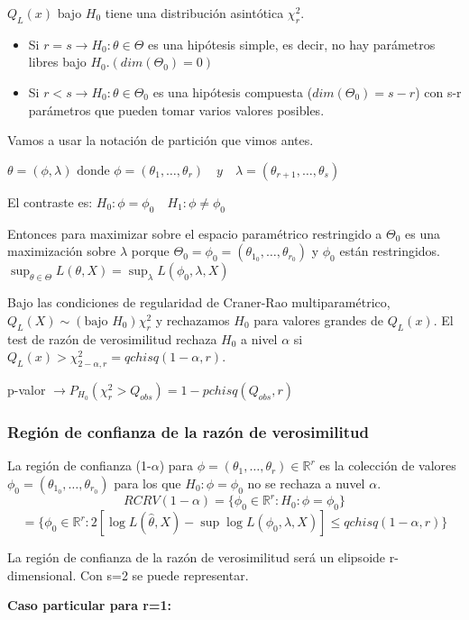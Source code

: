 $Q_L(x)$ bajo $H_0$ tiene una distribución asintótica $\chi^2_r$.
\begin{itemize}
    \item Si $r=s \to H_0:\theta \in \Theta$ es una hipótesis simple, es decir, no hay parámetros libres bajo $H_0.(dim(\Theta_0)=0)$
    \item Si $r<s \to H_0:\theta \in \Theta_0$ es una hipótesis compuesta ($dim(\Theta_0)=s-r$) con s-r parámetros que pueden tomar varios valores posibles.
\end{itemize}

Vamos a usar la notación de partición que vimos antes.

\(
\theta=(\phi,\lambda) \text{ donde } \phi=(\theta_1,\dots,\theta_r) \quad y \quad \lambda=(\theta_{r+1},\dots,\theta_s)
\)

El contraste es: $H_0:\phi=\phi_0 \quad H_1:\phi \neq \phi_0$

Entonces para maximizar sobre el espacio paramétrico restringido a $\Theta_0$ es una maximización sobre $\lambda$ porque
$\Theta_0=\phi_0=(\theta_{1_0},\dots,\theta_{r_0})$ y $\phi_0$ están restringidos.
$\sup_{\theta \in \Theta}L(\theta,X)=\sup_\lambda L(\phi_0,\lambda,X)$

Bajo las condiciones de regularidad de Craner-Rao multiparamétrico, $Q_L(X) \sim (\text{bajo }H_0) \chi^2_r$
y rechazamos $H_0$ para valores grandes de $Q_L(x)$. El test de razón de verosimilitud rechaza $H_0$ a nivel $\alpha$ si $Q_L(x)>\chi^2_{2-\alpha,r}=qchisq(1-\alpha,r)$.

p-valor $\to P_{H_0}(\chi^2_r>Q_{obs})=1-pchisq(Q_{obs},r)$

\subsubsection{Región de confianza de la razón de verosimilitud}

La región de confianza (1-$\alpha$) para $\phi=(\theta_1,\dots,\theta_r)\in \mathbb{R}^r$ es la colección de valores
$\phi_0=(\theta_{1_0},\dots,\theta_{r_0})$ para los que $H_0:\phi=\phi_0$ no se rechaza a nuvel $\alpha$.
\[
RCRV(1-\alpha)=\{\phi_0 \in \mathbb{R}^r:H_0:\phi=\phi_0\}
\]\[
    =\{\phi_0 \in \mathbb{R}^r:2[\log L(\hat{\theta},X)-\sup \log L(\phi_0,\lambda,X)] \leq qchisq(1-\alpha,r)\}
\]

La región de confianza de la razón de verosimilitud será un elipsoide r-dimensional. Con s=2 se puede representar.

\textbf{Caso particular para r=1:}

